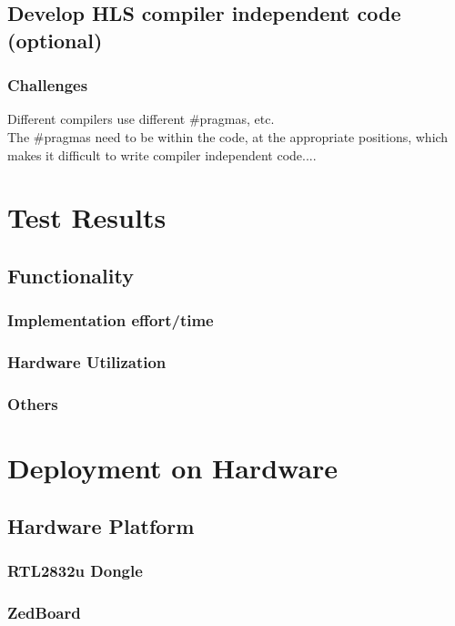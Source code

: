   \section{Develop HLS compiler independent code (optional)}
    \subsection{Challenges}
     Different compilers use different \#pragmas, etc.\\
     The \#pragmas need to be within the code, at the appropriate positions, which makes it difficult to write compiler independent code....


\chapter{Test Results}
  \section{Functionality}
  \subsection{Implementation effort/time}
  \subsection{Hardware Utilization}
  \subsection{Others}


\chapter{Deployment on Hardware}
  \section{Hardware Platform}
    \subsection{RTL2832u Dongle}
    \subsection{ZedBoard}
